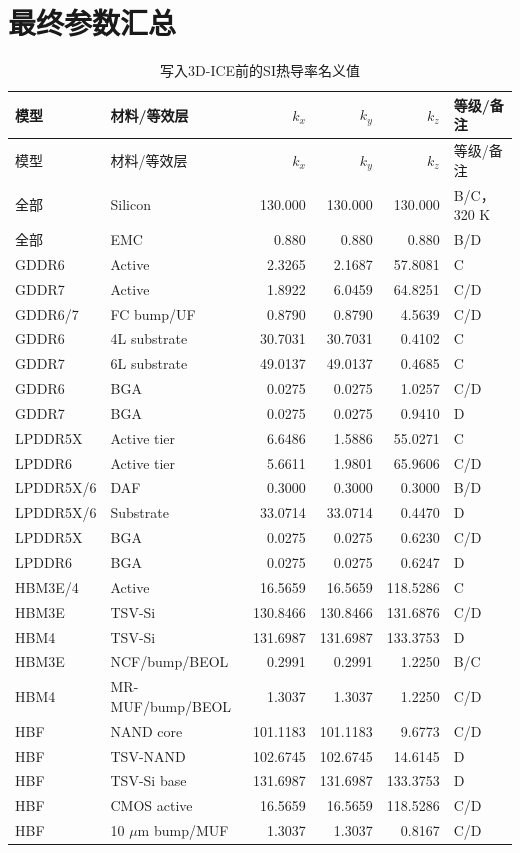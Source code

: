 \documentclass[UTF8,zihao=-4]{ctexart}
\begin{document}
\section{最终参数汇总}

\small
\begin{longtable}{p{3.1cm}p{3.1cm}rrr p{3.0cm}}
\caption{写入3D-ICE前的SI热导率名义值}\label{tab:all-results}\\
\toprule
模型 & 材料/等效层 & $k_x$ & $k_y$ & $k_z$ & 等级/备注 \\
\midrule
\endfirsthead
\toprule
模型 & 材料/等效层 & $k_x$ & $k_y$ & $k_z$ & 等级/备注 \\
\midrule
\endhead
\bottomrule
\endfoot
全部 & Silicon & 130.000 & 130.000 & 130.000 & B/C，320 K \\
全部 & EMC & 0.880 & 0.880 & 0.880 & B/D \\
GDDR6 & Active & 2.3265 & 2.1687 & 57.8081 & C \\
GDDR7 & Active & 1.8922 & 6.0459 & 64.8251 & C/D \\
GDDR6/7 & FC bump/UF & 0.8790 & 0.8790 & 4.5639 & C/D \\
GDDR6 & 4L substrate & 30.7031 & 30.7031 & 0.4102 & C \\
GDDR7 & 6L substrate & 49.0137 & 49.0137 & 0.4685 & C \\
GDDR6 & BGA & 0.0275 & 0.0275 & 1.0257 & C/D \\
GDDR7 & BGA & 0.0275 & 0.0275 & 0.9410 & D \\
LPDDR5X & Active tier & 6.6486 & 1.5886 & 55.0271 & C \\
LPDDR6 & Active tier & 5.6611 & 1.9801 & 65.9606 & C/D \\
LPDDR5X/6 & DAF & 0.3000 & 0.3000 & 0.3000 & B/D \\
LPDDR5X/6 & Substrate & 33.0714 & 33.0714 & 0.4470 & D \\
LPDDR5X & BGA & 0.0275 & 0.0275 & 0.6230 & C/D \\
LPDDR6 & BGA & 0.0275 & 0.0275 & 0.6247 & D \\
HBM3E/4 & Active & 16.5659 & 16.5659 & 118.5286 & C \\
HBM3E & TSV-Si & 130.8466 & 130.8466 & 131.6876 & C/D \\
HBM4 & TSV-Si & 131.6987 & 131.6987 & 133.3753 & D \\
HBM3E & NCF/bump/\allowbreak BEOL & 0.2991 & 0.2991 & 1.2250 & B/C \\
HBM4 & MR-MUF/bump/\allowbreak BEOL & 1.3037 & 1.3037 & 1.2250 & C/D \\
HBF & NAND core & 101.1183 & 101.1183 & 9.6773 & C/D \\
HBF & TSV-NAND & 102.6745 & 102.6745 & 14.6145 & D \\
HBF & TSV-Si base & 131.6987 & 131.6987 & 133.3753 & D \\
HBF & CMOS active & 16.5659 & 16.5659 & 118.5286 & C/D \\
HBF & 10 $\mu\mathrm{m}$ bump/MUF & 1.3037 & 1.3037 & 0.8167 & C/D \\
\end{longtable}
\normalsize
\end{document}
